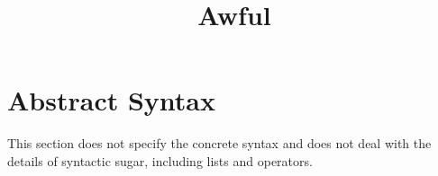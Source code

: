 \documentclass{article}
\author{}
\date{}
\title{Awful}
\begin{document}
  \maketitle

  \section*{Abstract Syntax}

    This section does not specify the concrete syntax and does not deal with the details of syntactic sugar, including lists and operators.
\end{document}
